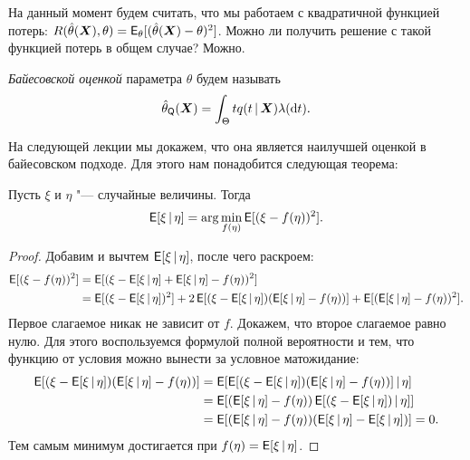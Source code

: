 На данный момент будем считать, что мы работаем с квадратичной функцией потерь: $R(\hat{\theta}(\bm{X}), \theta) = \operatorname{\mathsf{E}}_{\theta}[(\hat{\theta}(\bm{X}) - \theta)^{2}]$. Можно ли получить решение с такой функцией потерь в общем случае? Можно.
\begin{definition}
    \emph{Байесовской оценкой} параметра $\theta$ будем называть
    \[
        \hat{\theta}_{\mathsf{Q}}(\bm{X}) = \int_{\Theta} tq(t\,|\,\bm{X})\lambda(\dd t).
    \]
\end{definition}
На следующей лекции мы докажем, что она является наилучшей оценкой в байесовском подходе. Для этого нам понадобится следующая теорема:
\begin{theorem}
    Пусть $\xi$ и $\eta$ "--- случайные величины. Тогда
    \[
        \operatorname{\mathsf{E}}[\xi\,|\,\eta] = \arg\min_{f(\eta)} \operatorname{\mathsf{E}}[(\xi - f(\eta))^{2}].
    \]
\end{theorem}
\begin{proof}
    Добавим и вычтем $\operatorname{\mathsf{E}}[\xi\,|\,\eta]$, после чего раскроем:
    \begin{align*}
        \operatorname{\mathsf{E}}[(\xi - f(\eta))^{2}]
        &= \operatorname{\mathsf{E}}[(\xi - \operatorname{\mathsf{E}}[\xi\,|\,\eta] + \operatorname{\mathsf{E}}[\xi\,|\,\eta] - f(\eta))^{2}] \\
        &= \operatorname{\mathsf{E}}[(\xi - \operatorname{\mathsf{E}}[\xi\,|\,\eta])^{2}] + 2\operatorname{\mathsf{E}}[(\xi - \operatorname{\mathsf{E}}[\xi\,|\,\eta])(\operatorname{\mathsf{E}}[\xi\,|\,\eta] - f(\eta))] + \operatorname{\mathsf{E}}[(\operatorname{\mathsf{E}}[\xi\,|\,\eta] - f(\eta))^{2}].
    \end{align*}
    Первое слагаемое никак не зависит от $f$. Докажем, что второе слагаемое равно нулю. Для этого воспользуемся формулой полной вероятности и тем, что функцию от условия можно вынести за условное матожидание:
    \begin{align*}
        \operatorname{\mathsf{E}}[(\xi - \operatorname{\mathsf{E}}[\xi\,|\,\eta])(\operatorname{\mathsf{E}}[\xi\,|\,\eta] - f(\eta))]
        &= \operatorname{\mathsf{E}}[\operatorname{\mathsf{E}}[(\xi - \operatorname{\mathsf{E}}[\xi\,|\,\eta])(\operatorname{\mathsf{E}}[\xi\,|\,\eta] - f(\eta))]\,|\,\eta] \\
        &= \operatorname{\mathsf{E}}[(\operatorname{\mathsf{E}}[\xi\,|\,\eta] - f(\eta))\operatorname{\mathsf{E}}[(\xi - \operatorname{\mathsf{E}}[\xi\,|\,\eta])\,|\,\eta]] \\
        &= \operatorname{\mathsf{E}}[(\operatorname{\mathsf{E}}[\xi\,|\,\eta] - f(\eta))(\operatorname{\mathsf{E}}[\xi\,|\,\eta] - \operatorname{\mathsf{E}}[\xi\,|\,\eta])] = 0.
    \end{align*}
    Тем самым минимум достигается при $f(\eta) = \operatorname{\mathsf{E}}[\xi\,|\,\eta]$.
\end{proof}